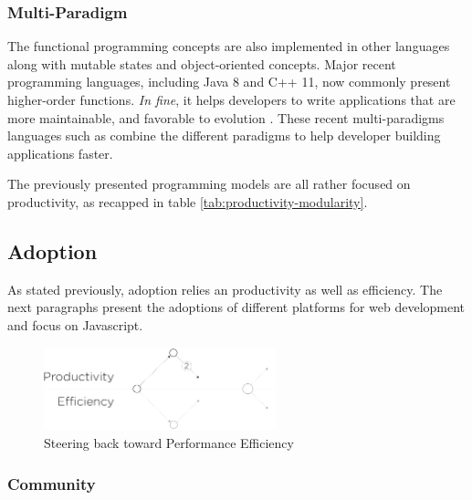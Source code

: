 \subsubsection{Multi-Paradigm}

The functional programming concepts are also implemented in other languages along with mutable states and object-oriented concepts.
Major recent programming languages, including Java 8 and C++ 11, now commonly present higher-order functions.
\textit{In fine}, it helps developers to write applications that are more maintainable, and favorable to evolution \cite{Hughes1989,Turner1981}.
These recent multi-paradigms languages such as  combine the different paradigms to help developer building applications faster.

\separator

The previously presented programming models are all rather focused on productivity, as recapped in table \ref{tab:productivity-modularity}.


\subsection{Adoption} \label{chapter3:software-productivity:adoption}

As stated previously, adoption relies an productivity as well as efficiency.
The next paragraphs present the adoptions of different platforms for web development and focus on Javascript.

\begin{figure}[!h]
\begin{center}
\includegraphics[width=0.6\textwidth]{../resources/state-of-the-art-2.pdf}
\end{center}
\caption{Steering back toward Performance Efficiency}
\label{fig:state-of-the-art-2}
\end{figure}

\subsubsection{Community}

